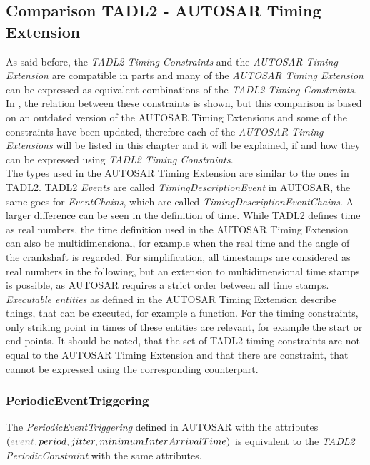 \subsection{Comparison TADL2 - AUTOSAR Timing Extension}
\label{comparisonConstraints}
	As said before, the \emph{TADL2 Timing Constraints} and the \emph{AUTOSAR Timing Extension} are compatible in parts and many of the \emph{AUTOSAR Timing Extension} can be expressed as equivalent combinations of the \emph{TADL2 Timing Constraints}. In \cite{TIMMO2USE}, the relation between these constraints is shown, but this comparison is based on an outdated version of the AUTOSAR Timing Extensions and some of the constraints have been updated, therefore each of the \emph{AUTOSAR Timing Extensions} will be listed in this chapter and it will be explained, if and how they can be expressed using \emph{TADL2 Timing Constraints}.\\
	The types used in the AUTOSAR Timing Extension are similar to the ones in TADL2. TADL2 \emph{Events} are called \emph{TimingDescriptionEvent} in AUTOSAR, the same goes for \emph{EventChains}, which are called \emph{TimingDescriptionEventChains}. A larger difference can be seen in the definition of time. While TADL2 defines time as real numbers, the time definition used in the AUTOSAR Timing Extension can also be multidimensional, for example when the real time and the angle of the crankshaft is regarded. For simplification, all timestamps are considered as real numbers in the following, but an extension to multidimensional time stamps is possible, as AUTOSAR requires a strict order between all time stamps. \emph{Executable entities} as defined in the AUTOSAR Timing Extension describe things, that can be executed, for example a function. For the timing constraints, only striking point in times of these entities are relevant, for example the start or end points. It should be noted, that the set of TADL2 timing constraints are not equal to the AUTOSAR Timing Extension and that there are constraint, that cannot be expressed using the corresponding counterpart.

	\subsubsection{PeriodicEventTriggering}
		The \emph{PeriodicEventTriggering} defined in AUTOSAR with the attributes\\ $(\textcolor{gray}{event}, period, jitter, minimumInterArrivalTime)$ is equivalent to the \emph{TADL2} \emph{PeriodicConstraint} with the same attributes.
		
